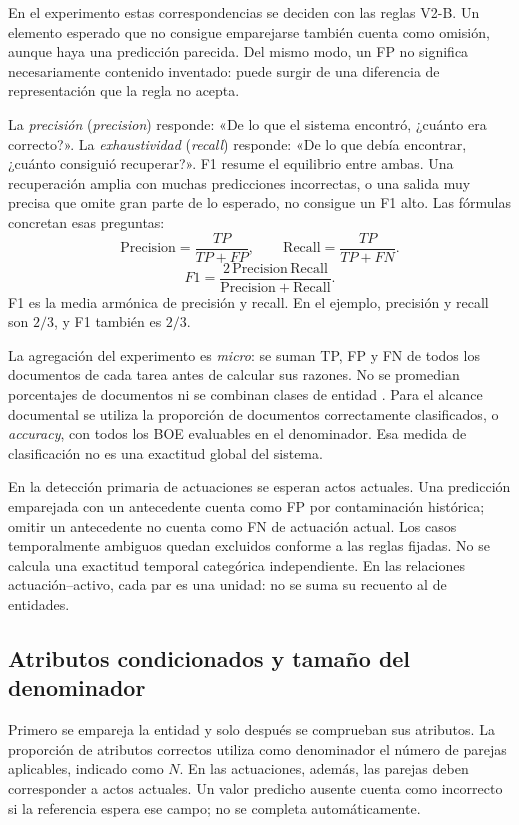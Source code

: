En el experimento estas correspondencias se deciden con las reglas V2-B.
Un elemento esperado que no consigue emparejarse también cuenta como
omisión, aunque haya una predicción parecida. Del mismo modo, un FP no
significa necesariamente contenido inventado: puede surgir de una
diferencia de representación que la regla no acepta.

La \emph{precisión} (\emph{precision}) responde: «De lo que el sistema
encontró, ¿cuánto era correcto?». La \emph{exhaustividad} (\emph{recall})
responde: «De lo que debía encontrar, ¿cuánto consiguió recuperar?».
F1 resume el equilibrio entre ambas. Una recuperación amplia con muchas
predicciones incorrectas, o una salida muy precisa que omite gran parte de
lo esperado, no consigue un F1 alto. Las fórmulas concretan esas preguntas:
\[
\mathrm{Precision}=\frac{TP}{TP+FP},
\qquad
\mathrm{Recall}=\frac{TP}{TP+FN}.
\]
\[
F1=\frac{2\,\mathrm{Precision}\,\mathrm{Recall}}
         {\mathrm{Precision}+\mathrm{Recall}}.
\]
F1 es la media armónica de precisión y recall. En el ejemplo, precisión y
recall son \(2/3\), y F1 también es \(2/3\).

La agregación del experimento es \emph{micro}: se suman TP, FP y FN de
todos los documentos de cada tarea antes de calcular sus razones.
No se promedian porcentajes de documentos ni se combinan clases de entidad
\cite{manning_introduction_2008}.
Para el alcance documental se utiliza la proporción de documentos
correctamente clasificados, o \emph{accuracy}, con todos los BOE evaluables
en el denominador. Esa medida de clasificación no es una exactitud global
del sistema.

En la detección primaria de actuaciones se esperan actos actuales. Una
predicción emparejada con un antecedente cuenta como FP por contaminación
histórica; omitir un antecedente no cuenta como FN de actuación actual.
Los casos temporalmente ambiguos quedan excluidos conforme a las reglas
fijadas. No se calcula una exactitud temporal categórica independiente.
En las relaciones actuación--activo, cada par es una unidad: no se suma
su recuento al de entidades.

\subsection{Atributos condicionados y tamaño del denominador}
Primero se empareja la entidad y solo después se comprueban sus atributos.
La proporción de atributos correctos utiliza como denominador el número de
parejas aplicables, indicado como \(N\). En las actuaciones, además, las
parejas deben corresponder a actos actuales. Un valor predicho ausente
cuenta como incorrecto si la referencia espera ese campo; no se completa
automáticamente.

